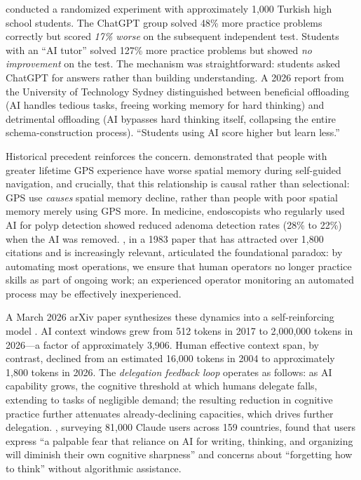 \documentclass[12pt]{article}
\begin{document}
\citet{Bastani2024chatgpt} conducted a randomized experiment with approximately 1,000 Turkish high school students. The ChatGPT group solved 48\% more practice problems correctly but scored \emph{17\% worse} on the subsequent independent test. Students with an ``AI tutor'' solved 127\% more practice problems but showed \emph{no improvement} on the test. The mechanism was straightforward: students asked ChatGPT for answers rather than building understanding. A 2026 report from the University of Technology Sydney distinguished between beneficial offloading (AI handles tedious tasks, freeing working memory for hard thinking) and detrimental offloading (AI bypasses hard thinking itself, collapsing the entire schema-construction process). ``Students using AI score higher but learn less.''

Historical precedent reinforces the concern. \citet{Dahmani2020gps} demonstrated that people with greater lifetime GPS experience have worse spatial memory during self-guided navigation, and crucially, that this relationship is causal rather than selectional: GPS use \emph{causes} spatial memory decline, rather than people with poor spatial memory merely using GPS more. In medicine, endoscopists who regularly used AI for polyp detection showed reduced adenoma detection rates (28\% to 22\%) when the AI was removed. \citet{Bainbridge1983ironies}, in a 1983 paper that has attracted over 1,800 citations and is increasingly relevant, articulated the foundational paradox: by automating most operations, we ensure that human operators no longer practice skills as part of ongoing work; an experienced operator monitoring an automated process may be effectively inexperienced.

A March 2026 arXiv paper synthesizes these dynamics into a self-reinforcing model \citep{CognitiveDivergence2026}. AI context windows grew from 512 tokens in 2017 to 2,000,000 tokens in 2026---a factor of approximately 3,906. Human effective context span, by contrast, declined from an estimated 16,000 tokens in 2004 to approximately 1,800 tokens in 2026. The \emph{delegation feedback loop} operates as follows: as AI capability grows, the cognitive threshold at which humans delegate falls, extending to tasks of negligible demand; the resulting reduction in cognitive practice further attenuates already-declining capacities, which drives further delegation. \citet{Anthropic2026interviews}, surveying 81,000 Claude users across 159 countries, found that users express ``a palpable fear that reliance on AI for writing, thinking, and organizing will diminish their own cognitive sharpness'' and concerns about ``forgetting how to think'' without algorithmic assistance.
\end{document}
